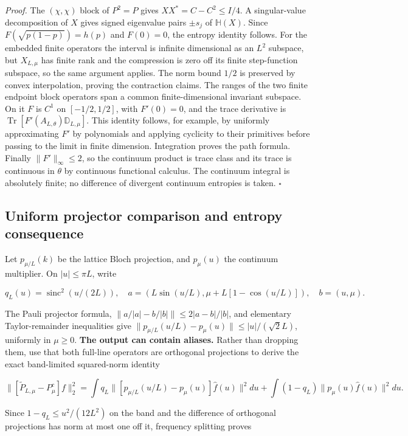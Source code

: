 \documentclass[
  10pt,
  a4paper,
]{article}
\begin{document}
\emph{Proof.} The \((\chi,\chi)\) block of \(P^2=P\) gives \(XX^*=C-C^2\le I/4\). A singular-value decomposition of \(X\) gives signed eigenvalue pairs \(\pm s_j\) of \(\mathbb H(X)\). Since \(F(\sqrt{p(1-p)})=h(p)\) and \(F(0)=0\), the entropy identity follows. For the embedded finite operators the interval is infinite dimensional as an \(L^2\) subspace, but \(X_{L,\mu}\) has finite rank and the compression is zero off its finite step-function subspace, so the same argument applies. The norm bound \(1/2\) is preserved by convex interpolation, proving the contraction claims. The ranges of the two finite endpoint block operators span a common finite-dimensional invariant subspace. On it \(F\) is \(C^1\) on \([-1/2,1/2]\), with \(F'(0)=0\), and the trace derivative is \(\operatorname{Tr}[F'(A_{L,\theta})\mathbb D_{L,\mu}]\). This identity follows, for example, by uniformly approximating \(F'\) by polynomials and applying cyclicity to their primitives before passing to the limit in finite dimension. Integration proves the path formula. Finally \(\|F'\|_\infty\le2\), so the continuum product is trace class and its trace is continuous in \(\theta\) by continuous functional calculus. The continuum integral is absolutely finite; no difference of divergent continuum entropies is taken. \(\square\)

\subsection{Uniform projector comparison and entropy consequence}\label{uniform-projector-comparison-and-entropy-consequence}

Let \(p_{\mu/L}(k)\) be the lattice Bloch projection, and \(p_\mu(u)\) the continuum multiplier. On \(|u|\le\pi L\), write

\[
q_L(u)=\operatorname{sinc}^2(u/(2L)),\quad
 a=(L\sin(u/L),\mu+L[1-\cos(u/L)]),\quad b=(u,\mu).
\]

The Pauli projector formula, \(\|a/|a|-b/|b|\|\le 2|a-b|/|b|\), and elementary Taylor-remainder inequalities give \(\|p_{\mu/L}(u/L)-p_\mu(u)\|\le |u|/(\sqrt2L)\), uniformly in \(\mu\ge0\). \textbf{The output can contain aliases.} Rather than dropping them, use that both full-line operators are orthogonal projections to derive the exact band-limited squared-norm identity

\[
\|[\widetilde P_{L,\mu}-P_\mu^c]f\|_2^2
=\int q_L\|[p_{\mu/L}(u/L)-p_\mu(u)]\widehat f(u)\|^2du
+\int(1-q_L)\|p_\mu(u)\widehat f(u)\|^2du.
\]

Since \(1-q_L\le u^2/(12L^2)\) on the band and the difference of orthogonal projections has norm at most one off it, frequency splitting proves
\end{document}
